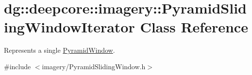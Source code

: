 \hypertarget{classdg_1_1deepcore_1_1imagery_1_1_pyramid_sliding_window_iterator}{}\section{dg\+:\+:deepcore\+:\+:imagery\+:\+:Pyramid\+Sliding\+Window\+Iterator Class Reference}
\label{classdg_1_1deepcore_1_1imagery_1_1_pyramid_sliding_window_iterator}


Represents a single \hyperlink{structdg_1_1deepcore_1_1imagery_1_1_pyramid_window}{Pyramid\+Window}.  




{\ttfamily \#include $<$imagery/\+Pyramid\+Sliding\+Window.\+h$>$}


